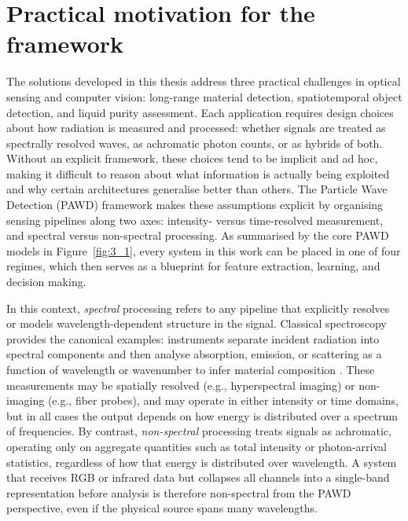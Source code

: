 \documentclass[12pt,a4paper,oneside]{report}
\let\oldsection\section
\renewcommand{\section}{\clearpage\oldsection}
\begin{document}
\section{Practical motivation for the framework}
\label{sec:pawd_practical_motivation}

\noindent
The solutions developed in this thesis address three practical challenges in optical sensing and computer vision: long-range material detection, spatiotemporal object detection, and liquid purity assessment. Each application requires design choices about how radiation is measured and processed: whether signals are treated as spectrally resolved waves, as achromatic photon counts, or as hybrids of both. Without an explicit framework, these choices tend to be implicit and ad hoc, making it difficult to reason about what information is actually being exploited and why certain architectures generalise better than others. The Particle Wave Detection (PAWD) framework makes these assumptions explicit by organising sensing pipelines along two axes: intensity- versus time-resolved measurement, and spectral versus non-spectral processing. As summarised by the core PAWD models in Figure~\ref{fig:3_1}, every system in this work can be placed in one of four regimes, which then serves as a blueprint for feature extraction, learning, and decision making.

In this context, \emph{spectral} processing refers to any pipeline that explicitly resolves or models wavelength-dependent structure in the signal. Classical spectroscopy provides the canonical examples: instruments separate incident radiation into spectral components and then analyse absorption, emission, or scattering as a function of wavelength or wavenumber to infer material composition \cite{charles1924,holt2016,duckett2000}. These measurements may be spatially resolved (e.g., hyperspectral imaging) or non-imaging (e.g., fiber probes), and may operate in either intensity or time domains, but in all cases the output depends on how energy is distributed over a spectrum of frequencies. By contrast, \emph{non-spectral} processing treats signals as achromatic, operating only on aggregate quantities such as total intensity or photon-arrival statistics, regardless of how that energy is distributed over wavelength. A system that receives RGB or infrared data but collapses all channels into a single-band representation before analysis is therefore non-spectral from the PAWD perspective, even if the physical source spans many wavelengths.
\end{document}
